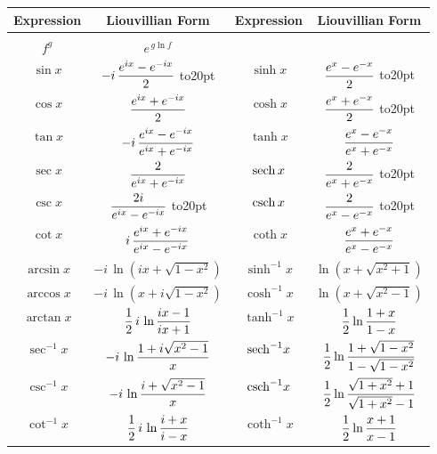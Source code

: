 \begin{center}
\begin{tabular}{c c c c @{\bigskip}}
Expression & \multicolumn{1}{c}{Liouvillian Form} &
Expression & \multicolumn{1}{c}{Liouvillian Form} \\
\hline
& \\
$f^g$ & $\displaystyle e^{\,g \ln f}$ &
 & \\
$\sin x$ & $\displaystyle {-i \,{{e^{ix} - e^{-ix}}\over 2}}$ \vbox to20pt{}&
 $\sinh x$ & $\displaystyle {{e^{x} - e^{-x}}\over 2}$ \vbox to20pt{} \\
$\cos x$ & $\displaystyle {{e^{ix} + e^{-ix}}\over 2}$ &
 $\cosh x$ & $\displaystyle {{e^{x} + e^{-x}}\over 2}$ \vbox to20pt{} \\
$\tan x$ & $\displaystyle {-i \,{{e^{ix}-e^{-ix}}\over {e^{ix}+e^{-ix}}}}$ &
 $\tanh x$ & $\displaystyle {{e^{x}-e^{-x}}\over {e^{x}+e^{-x}}}$ \\

$\sec x$ & $\displaystyle {2\over{e^{ix} + e^{-ix}}}$ &
 ${\rm sech}\, x$ & $\displaystyle {2\over{e^{x} + e^{-x}}}$ \vbox to20pt{} \\
$\csc x$ & $\displaystyle {{2i}\over{e^{ix} - e^{-ix}}}$ \vbox to20pt{}&
 ${\rm csch}\, x$ & $\displaystyle {2\over{e^{x} - e^{-x}}}$ \vbox to20pt{} \\
$\cot x$ & $\displaystyle {i \,{{e^{ix}+e^{-ix}}\over {e^{ix}-e^{-ix}}}}$ &
 $\coth x$ & $\displaystyle {{e^{x}+e^{-x}}\over {e^{x}-e^{-x}}}$ \\

$\arcsin x$ & $\displaystyle -i \,\ln (ix + \sqrt{1-x^2})$ &
 $\sinh^{-1} x$ & $\displaystyle \ln (x + \sqrt{x^2+1})$ \\
$\arccos x$ & $\displaystyle -i \,\ln (x + i\sqrt{1-x^2})$ &
 $\cosh^{-1} x$ & $\displaystyle \ln (x + \sqrt{x^2-1})$ \\
$\arctan x$ & $\displaystyle {1\over2}\,i\,\ln {{ix-1}\over{ix+1}}$ &
 $\tanh^{-1} x$ & $\displaystyle {1\over2} \ln {{1+x}\over{1-x}}$ \\

$\sec^{-1} x$ & $\displaystyle -i \,\ln {{1 + i\sqrt{x^2-1}}\over{x}}$ &
 ${\rm sech}^{-1} x$ & $\displaystyle {1\over2} \ln {{1+\sqrt{1-x^2}}\over{1-\sqrt{1-x^2}}}$ \\
$\csc^{-1} x$ & $\displaystyle -i \,\ln {{i + \sqrt{x^2-1}}\over{x}}$ &
 ${\rm csch}^{-1} x$ & $\displaystyle {1\over2} \ln {{\sqrt{1+x^2}+1}\over{\sqrt{1+x^2}-1}}$ \\
$\cot^{-1} x$ & $\displaystyle {1\over2}\,i\,\ln {{i+x}\over{i-x}}$ &
 $\coth^{-1} x$ & $\displaystyle {1\over2} \ln {{x+1}\over{x-1}}$ \\

\end{tabular}
\end{center}

